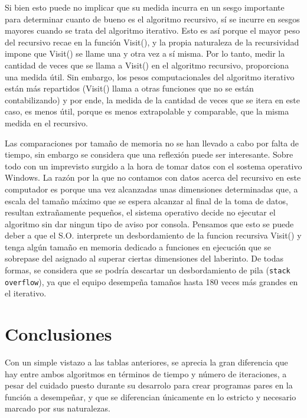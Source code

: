 \documentclass[12pt,a4paper]{article}
\begin{document}
 Si bien esto puede no implicar que su medida incurra en un sesgo importante para determinar cuanto de bueno es el algoritmo recursivo, sí se incurre en sesgos mayores cuando se trata del algoritmo iterativo. Esto es así porque el mayor peso del recursivo recae en la función \textsf{Visit()}, y la propia naturaleza de la recursividad impone que \textsf{Visit()} se llame una y otra vez a sí misma. Por lo tanto, medir la cantidad de veces que se llama a \textsf{Visit()} en el algoritmo recursivo, proporciona una medida útil. Sin embargo, los pesos computacionales del algoritmo iterativo están más repartidos (\textsf{Visit()} llama a otras funciones que no se están contabilizando) y por ende, la medida de la cantidad de veces que se itera en este caso, es menos útil, porque es menos extrapolable y comparable, que la misma medida en el recursivo. 

 \vspace{0.2cm}
Las comparaciones por tamaño de memoria no se han llevado a cabo por falta de tiempo, sin embargo se considera que una reflexión puede ser interesante. Sobre todo con un imprevisto surgido a la hora de tomar datos con el sostema operativo Windows. La razón por la que no contamos con datos acerca del recursivo en este computador es porque una vez alcanzadas unas dimensiones determinadas que, a escala del tamaño máximo que se espera alcanzar al final de la toma de datos, resultan extrañamente pequeños, el sistema operativo decide no ejecutar el algoritmo sin dar ningun tipo de aviso por consola. Pensamos que esto se puede deber a que el S.O. interprete un desbordamiento de la funcion recursiva \textsf{Visit()} y tenga algún tamaño en memoria dedicado a funciones en ejecución que se sobrepase del asignado al superar ciertas dimensiones del laberinto. De todas formas, se considera que se podría descartar un desbordamiento de pila (\verb|stack overflow|), ya que el equipo desempeña tamaños hasta 180 veces más grandes en el iterativo.

\clearpage
\section{Conclusiones}

Con un simple vistazo a las tablas anteriores, se aprecia la gran diferencia que hay entre ambos algoritmos en términos de tiempo y número de iteraciones, a pesar del cuidado puesto durante su desarrolo para crear programas pares en la función a desempeñar, y que se diferencian únicamente en lo estricto y necesario marcado por sus naturalezas. 
\end{document}
